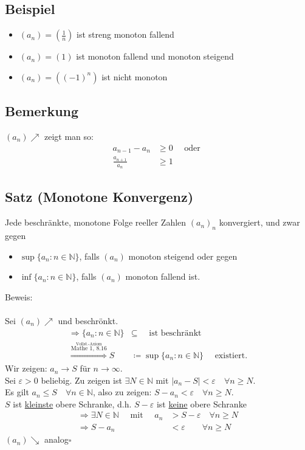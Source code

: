 \documentclass[12pt, titlepage]{article}
\newcommand{\N}{\mathds{N}}
\newcommand{\infn}{n\rightarrow\infty}
\renewcommand{\>}{\rightarrow}
\renewcommand{\*}{\cdot}
\renewcommand{\epsilon}{\varepsilon}
\begin{document}
	\subsection{Beispiel}
	\begin{itemize}
		\item $(a_n)=(\frac{1}{n})$ ist streng monoton fallend
		\item $(a_n)=(1)$ ist monoton fallend und monoton steigend
		\item $(a_n)=((-1)^n)$ ist nicht monoton
	\end{itemize}
	\subsection{Bemerkung}
	$(a_n)\nearrow$ zeigt man so:
	\begin{align*}
		a_{n-1}-a_n&\geq0\quad\textrm{ oder }\\
		\frac{a_{n+1}}{a_n}&\geq1 
	\end{align*}
	\subsection{Satz (Monotone Konvergenz)}
	Jede beschränkte, monotone Folge reeller Zahlen $(a_n)_n$ konvergiert, und zwar gegen
	\begin{itemize}
		\item $\sup\{a_n\colon n\in\N\}$, falls $(a_n)$ monoton steigend oder gegen
		\item $\inf\{a_n\colon n\in\N\}$, falls $(a_n)$ monoton fallend ist.
	\end{itemize}
	Beweis:\\
	\\
	Sei $(a_n)\nearrow$ und beschrönkt.
	\begin{align*}
		\Rightarrow \{a_n\colon n\in\N\}&\subseteq\quad\textrm{ ist beschränkt}\\
		\overset{\overset{\textrm{Vollst.-Axiom}}{\textrm{Mathe 1, 8.16}}}{\Rightarrow}S&\coloneqq\sup\{a_n\colon n\in\N\}\quad\textrm{ existiert.}
	\end{align*}
	Wir zeigen: $a_n\> S$ für $\infn$.\\
	Sei $\epsilon>0$ beliebig. Zu zeigen ist $\exists N\in\N$ mit $|a_n-S|<\epsilon\quad\forall n\geq N$.\\
	Es gilt $a_n\leq S\quad\forall n\in\N$, also zu zeigen: $S-a_n<\epsilon\quad\forall n\geq N$.\\
	$S$ ist \underline{kleinste} obere Schranke, d.h. $S-\epsilon$ ist \underline{keine} obere Schranke\\
	\begin{align*}
		\Rightarrow\exists N\in\N\quad\textrm{ mit }\quad a_n&>S-\epsilon\quad\forall n\geq N\\
		\Rightarrow S-a_n&<\epsilon\qquad\forall n\geq N
	\end{align*}
	$(a_n)\searrow$ analog\hfill$\square$
\end{document}
